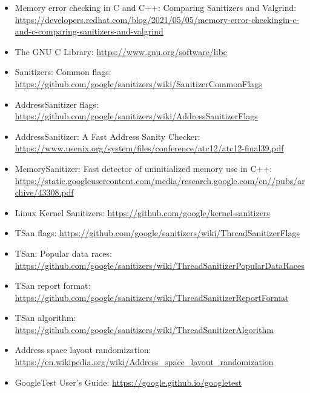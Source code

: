 \begin{itemize}
\item
Memory error checking in C and C++: Comparing Sanitizers and Valgrind: \url{https://developers.redhat.com/blog/2021/05/05/memory-error-checkingin-c-and-c-comparing-sanitizers-and-valgrind}

\item
The GNU C Library: \url{https://www.gnu.org/software/libc}

\item
Sanitizers: Common flags: \url{https://github.com/google/sanitizers/wiki/SanitizerCommonFlags}

\item
AddressSanitizer flags: \url{https://github.com/google/sanitizers/wiki/AddressSanitizerFlags}

\item
AddressSanitizer: A Fast Address Sanity Checker: \url{https://www.usenix.org/system/files/conference/atc12/atc12-final39.pdf}

\item
MemorySanitizer: Fast detector of uninitialized memory use in C++: \url{https://static.googleusercontent.com/media/research.google.com/en//pubs/archive/43308.pdf}

\item
Linux Kernel Sanitizers: \url{https://github.com/google/kernel-sanitizers}

\item
TSan flags: \url{https://github.com/google/sanitizers/wiki/ThreadSanitizerFlags}

\item
TSan: Popular data races: \url{https://github.com/google/sanitizers/wiki/ThreadSanitizerPopularDataRaces}

\item
TSan report format: \url{https://github.com/google/sanitizers/wiki/ThreadSanitizerReportFormat}

\item
TSan algorithm: \url{https://github.com/google/sanitizers/wiki/ThreadSanitizerAlgorithm}

\item
Address space layout randomization: \url{https://en.wikipedia.org/wiki/Address_space_layout_randomization}

\item
GoogleTest User’s Guide: \url{https://google.github.io/googletest}
\end{itemize}
